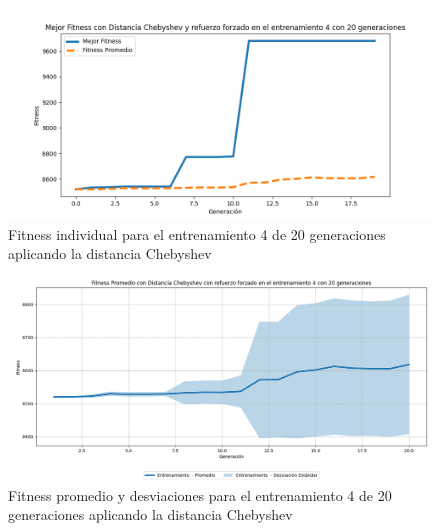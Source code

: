 \documentclass[conference]{IEEEtran}
\begin{document}
\begin{figure}[H]
    \centering
    \includegraphics[width=0.9 \linewidth]{Chebyshev/Fitness_individual_20Gen/Fitness_4_Cheby_20Gen.png}
    \caption{Fitness individual para el entrenamiento 4 de 20 generaciones aplicando la distancia Chebyshev}
    \label{fig:cheb_4_20}
\end{figure}
\begin{figure}[H]
    \centering
    \includegraphics[width=0.9 \linewidth]{Chebyshev/Fitness_individual_20Gen/Fitness_4_Cheby_20Gen_Sombra.png}
    \caption{Fitness promedio y desviaciones para el entrenamiento 4 de 20 generaciones aplicando la distancia Chebyshev}
    \label{fig:cheb_4_20_sombra}
\end{figure}
\end{document}

